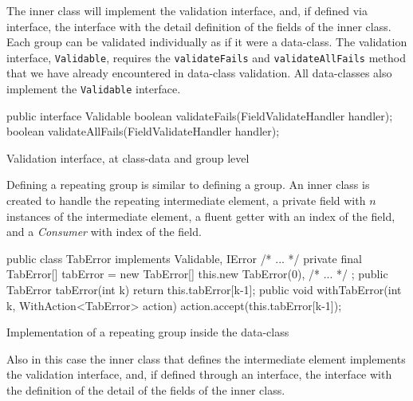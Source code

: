 The inner class will implement the validation interface, and, if defined via 
interface, the interface with the detail definition of the fields of the inner 
class. Each group can be validated individually as if it were a data-class.
The validation interface, \texttt{Validable}, requires the 
\texttt{validateFails} and \texttt{validateAllFails} method that we have already 
encountered in data-class validation. 
All data-classes also implement the \texttt{Validable} interface.

\begin{elisting}[!htb]
\begin{javacode}
public interface Validable {
    boolean validateFails(FieldValidateHandler handler);
    boolean validateAllFails(FieldValidateHandler handler);
}
\end{javacode}
\caption{Validation interface, at class-data and group level}
\label{lst:if.validable}
\end{elisting}

Defining a repeating group is similar to defining a group. An inner class is 
created to handle the repeating intermediate element, a private field with $n$ 
instances of the intermediate element, a fluent getter with an index of the 
field, and a \textit{Consumer} with index of the field.

\begin{elisting}[!htb]
\begin{javacode}
    public class TabError implements Validable, IError {/* ... */}
    private final TabError[] tabError = new TabError[] {
        this.new TabError(0),
        /* ... */
    };
    public TabError tabError(int k) { return this.tabError[k-1]; }
    public void withTabError(int k, WithAction<TabError> action) { action.accept(this.tabError[k-1]); }
\end{javacode}
\caption{Implementation of a repeating group inside the data-class}
\label{lst:occ.indef}
\end{elisting}

Also in this case the inner class that defines the intermediate element 
implements the validation interface, and, if defined through an interface, the 
interface with the definition of the detail of the fields of the inner class.
